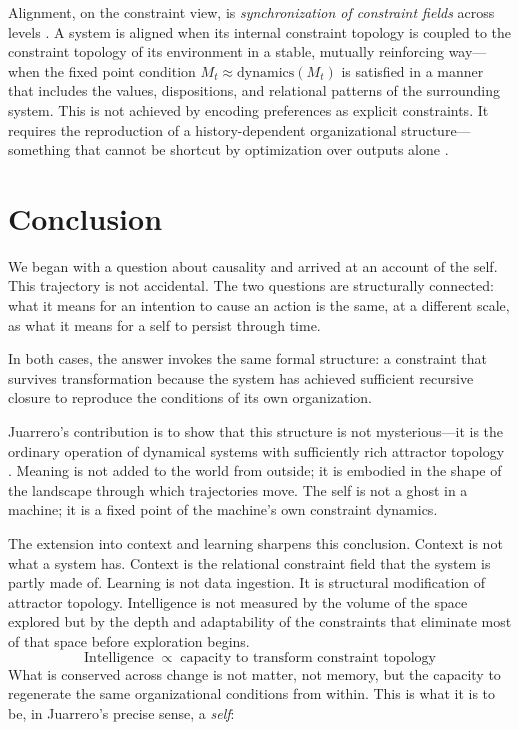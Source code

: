 \documentclass[11pt]{article}
\begin{document}
Alignment, on the constraint view, is \emph{synchronization of constraint fields} across
levels \citep{ashby1956}. A system is aligned when its internal constraint topology is
coupled to the constraint topology of its environment in a stable, mutually reinforcing
way---when the fixed point condition $M_t \approx \mathrm{dynamics}(M_t)$ is satisfied in
a manner that includes the values, dispositions, and relational patterns of the
surrounding system. This is not achieved by encoding preferences as explicit constraints.
It requires the reproduction of a history-dependent organizational structure---something
that cannot be shortcut by optimization over outputs alone \citep{varela1991,clark2008}.

\section{Conclusion}

We began with a question about causality and arrived at an account of the self. This
trajectory is not accidental. The two questions are structurally connected: what it means
for an intention to cause an action is the same, at a different scale, as what it means
for a self to persist through time.

In both cases, the answer invokes the same formal structure: a constraint that survives
transformation because the system has achieved sufficient recursive closure to reproduce
the conditions of its own organization.

Juarrero's contribution is to show that this structure is not mysterious---it is the
ordinary operation of dynamical systems with sufficiently rich attractor topology
\citep{prigogine1984,haken1983,kauffman2000}. Meaning is not added to the world from
outside; it is embodied in the shape of the landscape through which trajectories move.
The self is not a ghost in a machine; it is a fixed point of the machine's own constraint
dynamics.

The extension into context and learning sharpens this conclusion. Context is not what a
system has. Context is the relational constraint field that the system is partly made of.
Learning is not data ingestion. It is structural modification of attractor topology.
Intelligence is not measured by the volume of the space explored but by the depth and
adaptability of the constraints that eliminate most of that space before exploration begins.
\[
\mathrm{Intelligence} \;\propto\; \text{capacity to transform constraint topology}
\]
What is conserved across change is not matter, not memory, but the capacity to regenerate
the same organizational conditions from within. This is what it is to be, in Juarrero's
precise sense, a \emph{self}:
\end{document}

